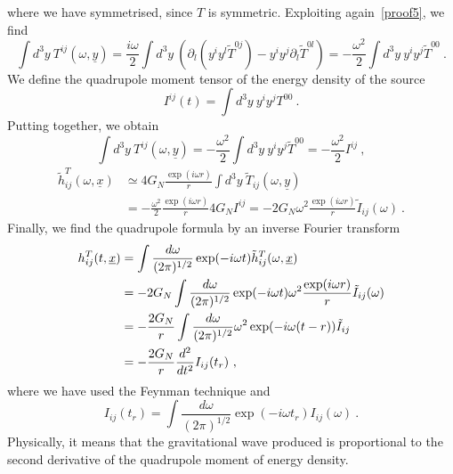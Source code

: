     where we have symmetrised, since $T$ is symmetric. Exploiting again~\eqref{proof5}, we find
    \begin{equation*}
        \int d^3 y ~ T^{ij} (\omega, \underline y)= \frac{i \omega}{2} \int d^3 y ~ (\partial_l (y^i y^l \tilde T^{0j}) - y^i y^j \partial_l \tilde T^{0l}) = - \frac{\omega^2}{2} \int d^3 y ~ y^i y^j \tilde T^{00} ~.
    \end{equation*}
    We define the quadrupole moment tensor of the energy density of the source
    \begin{equation*}
        I^{ij} (t) = \int d^3 y ~ y^i y^j T^{00} ~.
    \end{equation*}
    Putting together, we obtain
    \begin{equation*}
        \int d^3 y ~ T^{ij} (\omega, \underline y) = - \frac{\omega^2}{2} \int d^3 y ~ y^i y^j \tilde T^{00} = - \frac{\omega^2}{2} I^{ij} ~,
    \end{equation*}
    \begin{equation*}
    \begin{aligned}
        \tilde h^T_{ij} (\omega, \underline x) & \simeq 4 G_N \frac{\exp(i \omega r)}{r} \int d^3 y ~ \tilde T_{ij} (\omega, \underline{y}) \\ & = - \frac{\omega^2}{2} \frac{\exp(i \omega r)}{r} 4 G_N I^{ij} = - 2 G_N \omega^2 \frac{\exp(i \omega r)}{r} \tilde I_{ij} (\omega) ~.
    \end{aligned}
    \end{equation*}
    Finally, we find the quadrupole formula by an inverse Fourier transform 
    \begin{equation*}
    \begin{aligned}
        h^T_{ij} (t, \underline x) & = \int \frac{d\omega}{(2\pi)^{1/2}} \exp(- i \omega t) \tilde h^T_{ij} (\omega, \underline x) \\ & = - 2 G_N \int \frac{d\omega}{(2\pi)^{1/2}} \exp(- i \omega t) \omega^2 \frac{\exp(i \omega r)}{r} \tilde I_{ij} (\omega) \\ & = - \frac{2 G_N}{r} \int \frac{d\omega}{(2\pi)^{1/2}} \omega^2 \exp(- i \omega (t - r)) \tilde I_{ij} \\ & = - \frac{2 G_N}{r} \frac{d^2}{dt^2} I_{ij} (t_r) ~,
    \end{aligned}
    \end{equation*}
    where we have used the Feynman technique and 
    \begin{equation*}
        I_{ij} (t_r) = \int \frac{d\omega}{(2\pi)^{1/2}} \exp(- i \omega t_r) I_{ij} (\omega) ~.
    \end{equation*}
    Physically, it means that the gravitational wave produced is proportional to the second derivative of the quadrupole moment of energy density.


